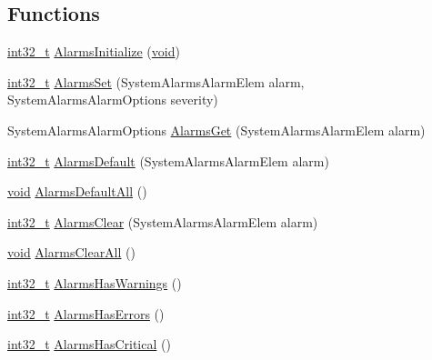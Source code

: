 \subsection*{Functions}
\begin{DoxyCompactItemize}
\item 
\hyperlink{group___n_a_m_e_gafd12020da5a235dfcf0c3c748fb5baed}{int32\-\_\-t} \hyperlink{group___open_pilot_libraries_gaa2707dbd32985c54ef5776147c4e0fc2}{Alarms\-Initialize} (\hyperlink{group___n_a_m_e_ga18028b8badbf1ea7e704ccac3c488e82}{void})
\item 
\hyperlink{group___n_a_m_e_gafd12020da5a235dfcf0c3c748fb5baed}{int32\-\_\-t} \hyperlink{group___open_pilot_libraries_gadd1139478e7c6bc1b6afaaa0d1d114dd}{Alarms\-Set} (System\-Alarms\-Alarm\-Elem alarm, System\-Alarms\-Alarm\-Options severity)
\item 
System\-Alarms\-Alarm\-Options \hyperlink{group___open_pilot_libraries_gad166792501b216a64df3e1ec0017db04}{Alarms\-Get} (System\-Alarms\-Alarm\-Elem alarm)
\item 
\hyperlink{group___n_a_m_e_gafd12020da5a235dfcf0c3c748fb5baed}{int32\-\_\-t} \hyperlink{group___open_pilot_libraries_gab3a5d632f443b5e8e914c13103d81e0e}{Alarms\-Default} (System\-Alarms\-Alarm\-Elem alarm)
\item 
\hyperlink{group___n_a_m_e_ga18028b8badbf1ea7e704ccac3c488e82}{void} \hyperlink{group___open_pilot_libraries_ga9daaea9cc9394928db79c5d475b5e621}{Alarms\-Default\-All} ()
\item 
\hyperlink{group___n_a_m_e_gafd12020da5a235dfcf0c3c748fb5baed}{int32\-\_\-t} \hyperlink{group___open_pilot_libraries_gafce7d51ebedc70de373224f839c77399}{Alarms\-Clear} (System\-Alarms\-Alarm\-Elem alarm)
\item 
\hyperlink{group___n_a_m_e_ga18028b8badbf1ea7e704ccac3c488e82}{void} \hyperlink{group___open_pilot_libraries_ga9a68c7084ffef47a37ebf1a0284ecc41}{Alarms\-Clear\-All} ()
\item 
\hyperlink{group___n_a_m_e_gafd12020da5a235dfcf0c3c748fb5baed}{int32\-\_\-t} \hyperlink{group___open_pilot_libraries_gaa6670051fe2fcab76f66b75a4331809f}{Alarms\-Has\-Warnings} ()
\item 
\hyperlink{group___n_a_m_e_gafd12020da5a235dfcf0c3c748fb5baed}{int32\-\_\-t} \hyperlink{group___open_pilot_libraries_ga8793bd5e55481a40145e4f81bf052a99}{Alarms\-Has\-Errors} ()
\item 
\hyperlink{group___n_a_m_e_gafd12020da5a235dfcf0c3c748fb5baed}{int32\-\_\-t} \hyperlink{group___open_pilot_libraries_ga0f241880ab969542907c4216fe85aa70}{Alarms\-Has\-Critical} ()

\end{DoxyCompactItemize}
